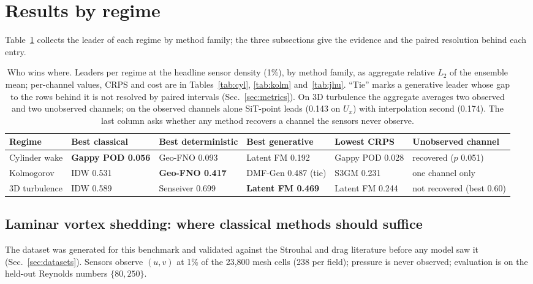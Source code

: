 \documentclass[aip,pof,reprint,amsmath,amssymb,superscriptaddress]{revtex4-1}
\newcommand{\dmfgen}{DMF-Gen}
\begin{document}
\section{Results by regime}\label{sec:results}

Table~\ref{tab:summary} collects the leader of each regime by method family;
the three subsections give the evidence and the paired resolution behind each
entry.

\begin{table}[tbp]
\caption{\label{tab:summary}Who wins where. Leaders per regime at the headline
sensor density (1\%), by method family, as aggregate relative $L_2$ of the
ensemble mean; per-channel values, CRPS and cost are in Tables~\ref{tab:cyl},
\ref{tab:kolm} and~\ref{tab:jhu}. ``Tie'' marks a generative leader whose gap
to the rows behind it is not resolved by paired intervals
(Sec.~\ref{sec:metrics}). On 3D turbulence the aggregate averages two observed
and two unobserved channels; on the observed channels alone SiT-point leads
(0.143 on $U_x$) with interpolation second (0.174). The last column asks
whether any method recovers a channel the sensors never observe.}
\footnotesize
\begin{ruledtabular}
\begin{tabular}{llllll}
Regime & Best classical & Best deterministic & Best generative & Lowest CRPS & Unobserved channel \\
\hline
Cylinder wake & \textbf{Gappy POD 0.056} & Geo-FNO 0.093 & Latent FM 0.192 & Gappy POD 0.028 & recovered ($p$ 0.051) \\
Kolmogorov & IDW 0.531 & \textbf{Geo-FNO 0.417} & \dmfgen{} 0.487 (tie) & S3GM 0.231 & one channel only \\
3D turbulence & IDW 0.589 & Senseiver 0.699 & \textbf{Latent FM 0.469} & Latent FM 0.244 & not recovered (best 0.60) \\
\end{tabular}
\end{ruledtabular}
\end{table}

\subsection{Laminar vortex shedding: where classical methods should
suffice}\label{sec:cylinder}

The dataset was generated for this benchmark and validated against the
Strouhal and drag literature before any model saw it
(Sec.~\ref{sec:datasets}). Sensors observe
$(u,v)$ at 1\% of the 23{,}800 mesh cells (238 per field); pressure is never
observed; evaluation is on the held-out Reynolds numbers $\{80, 250\}$.
\end{document}
